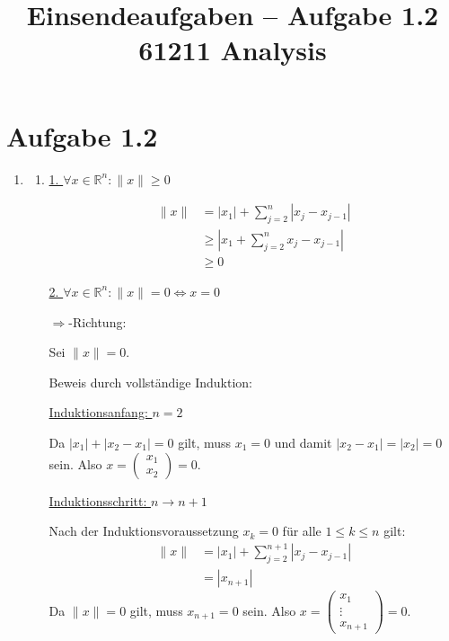 \documentclass[a4paper,12pt]{article}
\title{Einsendeaufgaben -- Aufgabe 1.2\\[0.5em]
\large 61211 Analysis}
\author{}
\date{}
\begin{document}
\maketitle

\section*{Aufgabe 1.2}

\begin{enumerate}[label=\alph*)]

    \item
    \begin{enumerate}[label=(\roman*)]

        \item
        \underline{1. $\forall x \in \mathbb{R}^n : \|x\| \geq 0$}

        \begin{align*}
            \|x\| &= |x_1| + \sum_{j=2}^{n} |x_j - x_{j-1}| \\
                  &\geq \left|x_1 + \sum_{j=2}^{n} x_j - x_{j-1}\right| \\
                  &\geq 0
        \end{align*}

        \underline{2. $\forall x \in \mathbb{R}^n : \|x\| = 0 \Longleftrightarrow x = 0$}

        \glqq$\Rightarrow$\grqq-Richtung:

        Sei $\|x\| = 0$.

        Beweis durch vollständige Induktion:

        \underline{Induktionsanfang: $n = 2$}

        Da $|x_1| + |x_2 - x_1| = 0$ gilt, muss $x_1 = 0$
        und damit $|x_2 - x_1| = |x_2| = 0$ sein.
        Also $x = \begin{pmatrix}x_1\\x_2\end{pmatrix} = 0$.

        \underline{Induktionsschritt: $n \to n+1$}

        Nach der Induktionsvoraussetzung $x_k = 0$ für alle $1 \leq k \leq n$ gilt:
        \begin{align*}
            \|x\| &= |x_1| + \sum_{j=2}^{n+1} |x_j - x_{j-1}| \\
                  &= |x_{n+1}|
        \end{align*}
        Da $\|x\| = 0$ gilt, muss $x_{n+1} = 0$ sein.
        Also $x = \begin{pmatrix}x_1\\\vdots\\x_{n+1}\end{pmatrix} = 0$.


\end{enumerate}
\end{enumerate}
\end{document}
